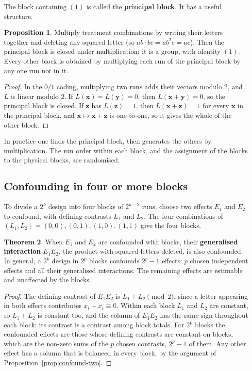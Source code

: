 \documentclass[11pt,a4paper]{article}
\numberwithin{equation}{section}
\theoremstyle{definition}
\newtheorem{thm}{Theorem}[subsection]
\newtheorem{prop}[thm]{Proposition}
\begin{document}
The block containing $(1)$ is called the \textbf{principal block}. It has a useful structure.

\begin{prop}\label{prop:principal-block}
Multiply treatment combinations by writing their letters together and deleting any squared letter (so $ab \cdot bc = ab^2c = ac$). Then the principal block
is closed under multiplication: it is a group, with identity $(1)$. Every other block is obtained by multiplying each run of the principal block by any
one run not in it.
\end{prop}

\begin{proof}
In the $0/1$ coding, multiplying two runs adds their vectors modulo $2$, and $L$ is linear modulo $2$. If $L(\mathbf x) = L(\mathbf y) = 0$, then $L(\mathbf x + \mathbf y) = 0$, so the principal
block is closed. If $\mathbf z$ has $L(\mathbf z) = 1$, then $L(\mathbf x + \mathbf z) = 1$ for every $\mathbf x$ in the principal block, and $\mathbf x \mapsto \mathbf x + \mathbf z$ is one-to-one, so it gives the whole of the
other block.
\end{proof}

In practice one finds the principal block, then generates the others by multiplication. The run order within each block, and the assignment
of the blocks to the physical blocks, are randomised.

\subsection{Confounding in four or more blocks}
To divide a $2^k$ design into four blocks of $2^{k-2}$ runs, choose two effects $E_1$ and $E_2$ to confound, with defining contrasts $L_1$ and $L_2$. The four
combinations of $(L_1, L_2) = (0,0), (0,1), (1,0), (1,1)$ give the four blocks.

\begin{thm}\label{thm:gen-interaction}
When $E_1$ and $E_2$ are confounded with blocks, their \textbf{generalised interaction} $E_1E_2$, the product with squared letters deleted, is also confounded.
In general, a $2^k$ design in $2^p$ blocks confounds $2^p - 1$ effects: $p$ chosen independent effects and all their generalised interactions. The remaining
effects are estimable and unaffected by the blocks.
\end{thm}

\begin{proof}
The defining contrast of $E_1E_2$ is $L_1 + L_2 \pmod 2$, since a letter appearing in both effects contributes $x_i + x_i \equiv 0$. Within each block $L_1$ and $L_2$ are
constant, so $L_1 + L_2$ is constant too, and the column of $E_1E_2$ has the same sign throughout each block: its contrast is a contrast among block totals.
For $2^p$ blocks the confounded effects are those whose defining contrasts are constant on blocks, which are the non-zero sums of the $p$ chosen
contrasts, $2^p - 1$ of them. Any other effect has a column that is balanced in every block, by the argument of Proposition~\ref{prop:confound-two}.
\end{proof}
\end{document}

